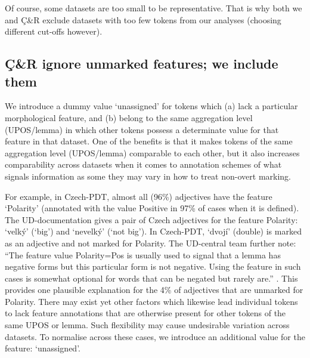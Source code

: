 \documentclass[USenglish]{article}
\begin{document}
Of course, some datasets are too small to be representative.
That is why both we and Ç\&R exclude datasets with too few tokens from our analyses (choosing different cut-offs however).

\subsection{Ç\&R ignore unmarked features; we include them} \label{appedix:differences_dummy}

We introduce a dummy value `unassigned' for tokens which (a) lack a particular morphological feature, and (b) belong to the same aggregation level (UPOS/lemma) in which other tokens possess a determinate value for that feature in that dataset.
One of the benefits is that it makes tokens of the same aggregation level (UPOS/lemma) comparable to each other, but it also increases comparability across datasets when it comes to annotation schemes of what signals information as some they may vary in how to treat non-overt marking.

For example, in Czech-PDT, almost all (96\%) adjectives have the feature `Polarity' (annotated with the value Positive in 97\% of cases when it is defined).
The UD-documentation gives a pair of Czech adjectives for the feature Polarity: `velký' (`big') and `nevelký' (`not big'). 
In Czech-PDT, `dvojí' (double) is marked as an adjective and not marked for Polarity.
The UD-central team further note: ``The feature value Polarity=Pos is usually used to signal that a lemma has negative forms but this particular form is not negative. Using the feature in such cases is somewhat optional for words that can be negated but rarely are.'' \citep{de_marneffe_universal_2022}. 
This provides one plausible explanation for the 4\% of adjectives that are unmarked for Polarity.
There may exist yet other factors which likewise lead individual tokens to lack feature annotations that are otherwise present for other tokens of the same UPOS or lemma.
Such flexibility may cause undesirable variation across datasets.
To normalise across these cases, we introduce an additional value for the feature: `unassigned’.
\end{document}
